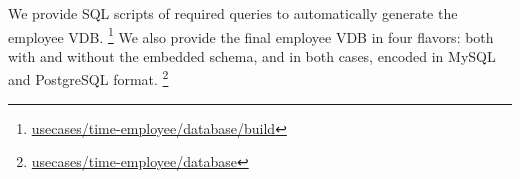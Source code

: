 We provide SQL scripts of required queries to automatically 
generate the employee VDB.
\footnote{\href{https://github.com/lambda-land/VDBMS/blob/master/usecases/time-employee/database/build}{usecases/time-employee/database/build}}
%
%
We also provide the final employee VDB in four flavors: both with and without the
embedded schema, and in both cases, encoded in MySQL and PostgreSQL format.%
\footnote{\href{https://github.com/lambda-land/VDBMS/tree/master/usecases/time-employee/database}{usecases/time-employee/database}}


%
%
%
